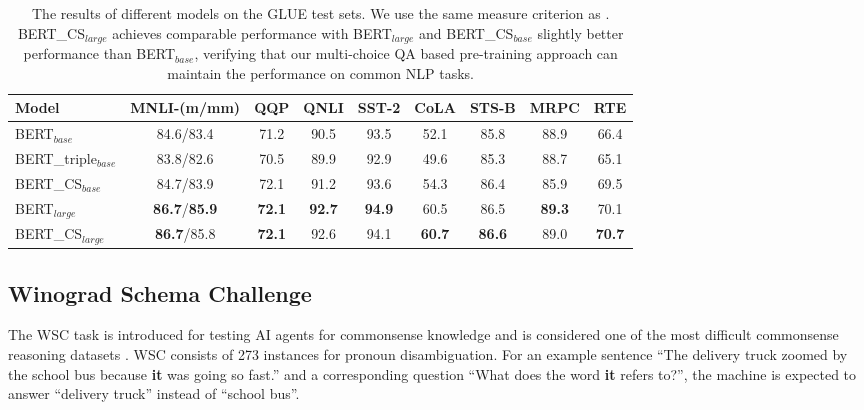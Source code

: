 \documentclass[11pt,a4paper]{article}
\begin{document}
\begin{table*}[t!]
	\begin{center}
		\small
		\begin{tabular}{p{2.2cm}|c|c|c|c|c|c|c|c}
			\toprule
            \textbf{Model}             & \textbf{MNLI-(m/mm)} & \textbf{QQP} & \textbf{QNLI} & \textbf{SST-2} & \textbf{CoLA} & \textbf{STS-B} & \textbf{MRPC} & \textbf{RTE} \\
            \midrule
            BERT$_{base}$     & 84.6/83.4   & 71.2 & 90.5 & 93.5& 52.1 & 85.8 & 88.9 & 66.4  \\
            \midrule
            BERT\_triple$_{base}$     & 83.8/82.6   & 70.5 & 89.9 & 92.9& 49.6 & 85.3 & 88.7 & 65.1  \\
            \midrule
            BERT\_CS$_{base}$  & 84.7/83.9  &  72.1  &91.2 & 93.6& 54.3 & 86.4 & 85.9 & 69.5  \\
            \midrule
            BERT$_{large}$    & \textbf{86.7}/\textbf{85.9} &\textbf{72.1}& \textbf{92.7}& \textbf{94.9} & 60.5 & 86.5 & \textbf{89.3} & 70.1 \\
            \midrule
            BERT\_CS$_{large}$    & \textbf{86.7}/85.8 &\textbf{72.1}& 92.6& 94.1 & \textbf{60.7} & \textbf{86.6} & 89.0 & \textbf{70.7} \\
			\bottomrule
		\end{tabular}
	\end{center}
	\caption{The results of different models on the GLUE test sets. We use the same measure criterion as \citet{devlin-etal-2019-bert}. BERT\_CS$_{large}$ achieves comparable performance with BERT$_{large}$ and BERT\_CS$_{base}$ slightly better performance than BERT$_{base}$, verifying that our multi-choice QA based pre-training approach can maintain the performance on common NLP tasks.}
\label{tab:GLUE_results}
\end{table*}

\subsection{Winograd Schema Challenge}
The WSC task \citep{levesque2012winograd} is introduced for testing AI agents for commonsense knowledge and is considered one of the most difficult commonsense reasoning datasets \citep{zhou2019evaluating}.
WSC consists of 273 instances for pronoun disambiguation. 
For an example sentence ``The delivery truck zoomed by the school bus because \textbf{it} was going so fast.'' and a corresponding question ``What does the word \textbf{it} refers to?'', the machine is expected to answer ``delivery truck'' instead of ``school bus''. 
\end{document}
